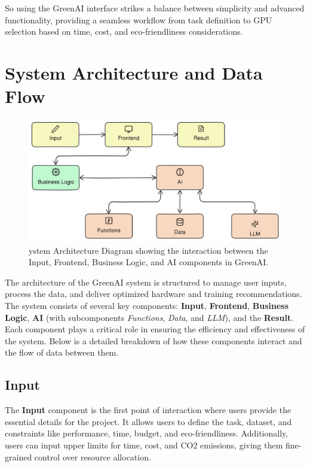 \documentclass{report}
\begin{document}
So using the GreenAI interface strikes a balance between simplicity and advanced functionality, providing a seamless workflow from task definition to GPU selection based on time, cost, and eco-friendliness considerations.


\chapter{System Architecture and Data Flow}

\begin{figure}[h]
    \centering
    \includegraphics[width=1\linewidth]{Archfertig.png}
    \caption{ystem Architecture Diagram showing the interaction between the Input, Frontend, Business Logic, and AI components in GreenAI.}
    \label{fig:enter-label}
\end{figure}

The architecture of the GreenAI system is structured to manage user inputs, process the data, and deliver optimized hardware and training recommendations. The system consists of several key components: \textbf{Input}, \textbf{Frontend}, \textbf{Business Logic}, \textbf{AI} (with subcomponents \textit{Functions}, \textit{Data}, and \textit{LLM}), and the \textbf{Result}. Each component plays a critical role in ensuring the efficiency and effectiveness of the system. Below is a detailed breakdown of how these components interact and the flow of data between them.

\section{Input}
The \textbf{Input} component is the first point of interaction where users provide the essential details for the project. It allows users to define the task, dataset, and constraints like performance, time, budget, and eco-friendliness. Additionally, users can input upper limits for time, cost, and CO2 emissions, giving them fine-grained control over resource allocation.
\end{document}
